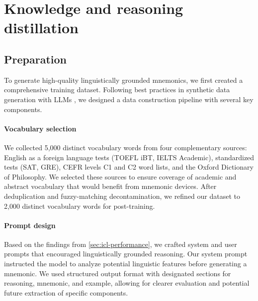 
\section{Knowledge and reasoning distillation} \label{sec:distillation}


\subsection{Preparation} \label{sec:data-prep}
To generate high-quality linguistically grounded mnemonics, we first created a comprehensive training dataset. Following best practices in synthetic data generation with LLMs \citetext{\citealp{longLLMsDrivenSyntheticData2024b}, \citealp{openthoughtsteamOpenThoughts2025}}, we designed a data construction pipeline with several key components.

\paragraph*{Vocabulary selection} We collected 5,000 distinct vocabulary words from four complementary sources: English as a foreign language tests (TOEFL iBT, IELTS Academic), standardized tests (SAT, GRE), CEFR levels C1 and C2 word lists, and the Oxford Dictionary of Philosophy. We selected these sources to ensure coverage of academic and abstract vocabulary that would benefit from mnemonic devices. After deduplication and fuzzy-matching decontamination, we refined our dataset to 2,000 distinct vocabulary words for post-training.

\paragraph*{Prompt design} Based on the findings from \cref{sec:icl-performance}, we crafted system and user prompts that encouraged linguistically grounded reasoning. Our system prompt instructed the model to analyze potential linguistic features before generating a mnemonic. We used structured output format with designated sections for reasoning, mnemonic, and example, allowing for clearer evaluation and potential future extraction of specific components.

